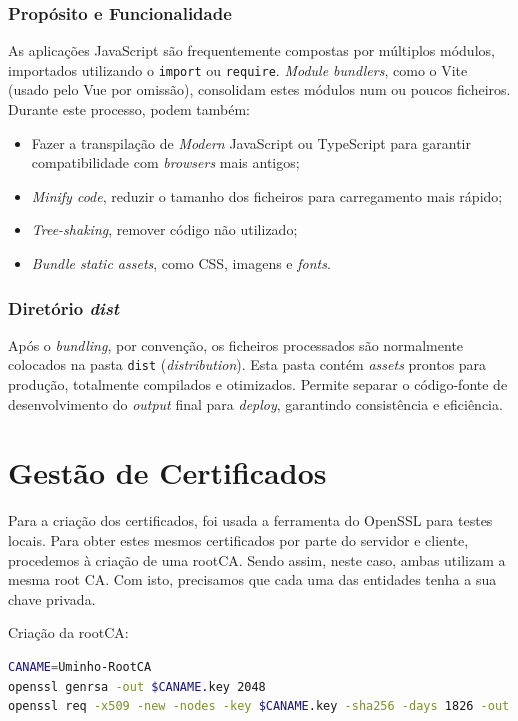 \subsubsection{Propósito e Funcionalidade}

As aplicações JavaScript são frequentemente compostas por múltiplos módulos, importados utilizando o \texttt{import} ou \texttt{require}. \textit{Module bundlers}, como o Vite (usado pelo Vue por omissão), consolidam estes módulos num ou poucos ficheiros. Durante este processo, podem também:

\begin{itemize}
    \item Fazer a transpilação de \textit{Modern} JavaScript ou TypeScript para garantir compatibilidade com \textit{browsers} mais antigos;
    \item \textit{Minify code}, reduzir o tamanho dos ficheiros para carregamento mais rápido;
    \item \textit{Tree-shaking}, remover código não utilizado;
    \item \textit{Bundle static assets}, como CSS, imagens e \textit{fonts}.
\end{itemize}

\subsubsection{Diretório \textit{dist}}

Após o \textit{bundling}, por convenção, os ficheiros processados são normalmente colocados na pasta \texttt{dist} (\textit{distribution}). Esta pasta contém \textit{assets} prontos para produção, totalmente compilados e otimizados. Permite separar o código-fonte de desenvolvimento do \textit{output} final para \textit{deploy}, garantindo consistência e eficiência.

\section{Gestão de Certificados}
Para a criação dos certificados, foi usada a ferramenta do OpenSSL para testes locais. Para obter estes mesmos certificados por parte do servidor e cliente, procedemos à criação de uma rootCA. Sendo assim, neste caso, ambas utilizam a mesma root CA. Com isto, precisamos que cada uma das entidades tenha a sua chave privada.

Criação da rootCA:

\begin{lstlisting}[language=sh]
CANAME=Uminho-RootCA
openssl genrsa -out $CANAME.key 2048
openssl req -x509 -new -nodes -key $CANAME.key -sha256 -days 1826 -out $CANAME.crt
\end{lstlisting}

